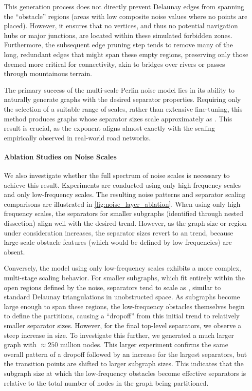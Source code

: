 This generation process does not directly prevent Delaunay edges from spanning the \enquote{obstacle} regions (areas with low composite noise values where no points are placed).
However, it ensures that no vertices, and thus no potential navigation hubs or major junctions, are located within these simulated forbidden zones.
Furthermore, the subsequent edge pruning step tends to remove many of the long, redundant edges that might span these empty regions, preserving only those deemed more critical for connectivity, akin to bridges over rivers or passes through mountainous terrain.

The primary success of the multi-scale Perlin noise model lies in its ability to naturally generate graphs with the desired separator properties.
Requiring only the selection of a suitable range of scales, rather than extensive fine-tuning, this method produces graphs whose separator sizes scale approximately as .
This result is crucial, as the exponent aligns almost exactly with the scaling empirically observed in real-world road networks.


\paragraph{Ablation Studies on Noise Scales}

We also investigate whether the full spectrum of noise scales is necessary to achieve this result.
Experiments are conducted using only high-frequency scales and only low-frequency scales.
The resulting noise patterns and separator scaling comparisons are illustrated in \cref{fig:noise_layer_ablation}.
When using only high-frequency scales, the separators for smaller subgraphs (identified through nested dissection) align well with the desired trend. However, as the graph size or region under consideration increases, the separator sizes revert to an  trend, because large-scale obstacle features (which would be defined by low frequencies) are absent.

Conversely, the model using only low-frequency scales exhibits a more complex, multi-stage scaling behavior.
For smaller subgraphs, which fit entirely within the open regions defined by the noise, separators tend to scale as , similar to standard Delaunay triangulations in unobstructed space.
As subgraphs become large enough to span these regions, the low-frequency obstacles themselves begin to define the partitions, causing a \enquote{dropoff} from this initial trend to relatively smaller separator sizes.
However, for the final top-level separators, we observe a steep increase in size.
To investigate this further, we generated a much larger graph with \(\approx 250\) million nodes.
This larger experiment confirms the same overall pattern of a dropoff followed by an increase for the largest separators, but the transition points are shifted to larger subgraph sizes.
This indicates that the subgraph size at which the low-frequency obstacles become effective separators is relative to the total number of nodes in the graph being partitioned.


